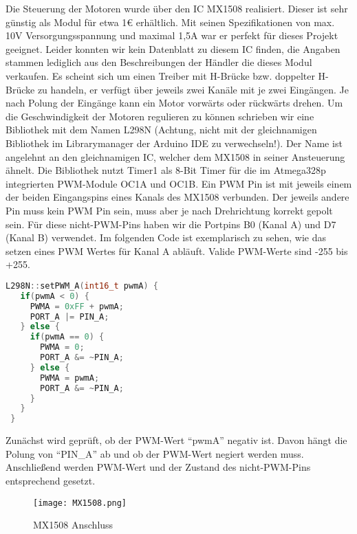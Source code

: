 \documentclass[12pt]{article}
\begin{document}
Die Steuerung der Motoren wurde über den IC MX1508 realisiert. Dieser ist sehr günstig als Modul für etwa 1€ erhältlich.
Mit seinen Spezifikationen von max. 10V Versorgungsspannung und maximal 1,5A war er perfekt für dieses Projekt geeignet.
Leider konnten wir kein Datenblatt zu diesem IC finden, die Angaben stammen lediglich aus den Beschreibungen der Händler die dieses Modul verkaufen.
Es scheint sich um einen Treiber mit H-Brücke bzw. doppelter H-Brücke zu handeln, er verfügt über jeweils zwei Kanäle mit je zwei Eingängen. Je nach Polung der Eingänge kann ein Motor vorwärts oder rückwärts drehen.
Um die Geschwindigkeit der Motoren regulieren zu können schrieben wir eine Bibliothek mit dem Namen L298N (Achtung, nicht mit der gleichnamigen Bibliothek im Librarymanager der Arduino IDE zu verwechseln!).
Der Name ist angelehnt an den gleichnamigen IC, welcher dem MX1508 in seiner Ansteuerung ähnelt.
Die Bibliothek nutzt Timer1 als 8-Bit Timer für die im Atmega328p integrierten PWM-Module OC1A und OC1B.
Ein PWM Pin ist mit jeweils einem der beiden Eingangspins eines Kanals des MX1508 verbunden. Der jeweils andere Pin muss kein PWM Pin sein, muss aber je nach Drehrichtung korrekt gepolt sein. Für diese nicht-PWM-Pins haben wir die Portpins B0 (Kanal A) und D7 (Kanal B) verwendet.
\newline
Im folgenden Code ist exemplarisch zu sehen, wie das setzen eines PWM Wertes für Kanal A abläuft. Valide PWM-Werte sind -255 bis +255.


\begin{file}[MX1508]
        \begin{lstlisting}[language=C++]
 L298N::setPWM_A(int16_t pwmA) {
   if(pwmA < 0) {
     PWMA = 0xFF + pwmA;
     PORT_A |= PIN_A;
   } else {
     if(pwmA == 0) {
       PWMA = 0;
       PORT_A &= ~PIN_A;
     } else {
       PWMA = pwmA;
       PORT_A &= ~PIN_A;
     }
   }
 }
        \end{lstlisting}
\end{file}

Zunächst wird geprüft, ob der PWM-Wert "`pwmA"'  negativ ist. Davon hängt die Polung von "`PIN\_A"' ab und ob der PWM-Wert negiert werden muss.
\newline
Anschließend werden PWM-Wert und der Zustand des nicht-PWM-Pins entsprechend gesetzt.

\newpage
\begin{figure}[h]
	\texttt{[image: MX1508.png]}
	\centering
	\caption{MX1508 Anschluss \cite{MX1508}}
\end{figure} 
\end{document}
